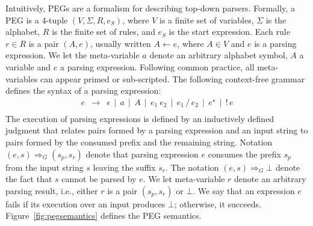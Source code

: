 Intuitively, PEGs are a formalism for describing top-down parsers.
Formally, a PEG is a 4-tuple \((V,\Sigma,R,e_S)\), where \(V\) is a 
finite set of variables, \(\Sigma\) is the alphabet, \(R\) is the finite 
set of rules, and \(e_S\) is the start expression. Each rule \(r \in R\) is a 
pair \((A,e)\), usually written \(A \leftarrow e\), where \(A \in V\) and \(e\) 
is a parsing expression. We let the meta-variable \(a\) denote an 
arbitrary alphabet symbol, \(A\) a variable and \(e\) a parsing expression. 
Following common practice, all meta-variables can appear primed or 
sub-scripted. The following context-free grammar defines
the syntax of a parsing expression:
\[
   \begin{array}{lcl}
      e & \to & \epsilon \, \mid \, a \, \mid \, A\, \mid \,e_1\:e_2\,
                  \mid\,e_1\,/\,e_2\, \mid \,e^\star\, \mid \,!\,e \\
   \end{array}
\]
The execution of parsing expressions is defined by an inductively defined
judgment that relates pairs formed by a parsing expression and an input string
to pairs formed by the consumed prefix and the remaining string.
Notation \((e,s) \Rightarrow_G (s_p,s_r)\) denote that parsing expression \(e\)
consumes the prefix \(s_p\) from the input string \(s\) leaving the suffix \(s_r\).
The notation \((e,s) \Rightarrow_G \bot\) denote the fact that \(s\) cannot be 
parsed by \(e\). We let meta-variable \(r\) denote an arbitrary parsing result, i.e.,
either \(r\) is a pair \((s_p,s_r)\) or \(\bot\). We say that an expression \(e\)
fails if its execution over an input produces \(\bot\); otherwise, it succeeds.
Figure~\ref{fig:pegsemantics} defines the PEG semantics.
